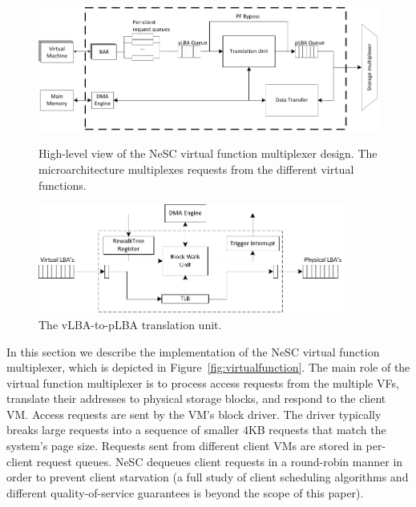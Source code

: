 \begin{figure}[t]
  \centering
  \includegraphics[width=\textwidth]{figs/virtual_function.pdf}
  \caption{High-level view of the NeSC virtual function multiplexer design. The microarchitecture multiplexes requests from the different virtual functions.}
   \label{fig:virtualfunction}

   \vspace*{3ex}
   
  \centering
  \includegraphics[width=0.9\textwidth]{figs/translation_unit.pdf}
  \caption{The vLBA-to-pLBA translation unit.}
   \label{fig:translation_unit}
\end{figure}

In this section we describe the implementation of the NeSC virtual function multiplexer, which is depicted in Figure~\ref{fig:virtualfunction}. The main role of the  virtual function multiplexer is to process access requests from the multiple VFs, translate their addresses to physical storage blocks, and respond to the client VM.
%
Access requests are sent by the VM's block driver. The driver typically breaks large requests into a sequence of smaller 4KB requests that match the system's page size. Requests sent from different client VMs are stored in per-client request queues. NeSC dequeues client requests in a round-robin manner in order to prevent client starvation (a full study of client scheduling algorithms and different quality-of-service guarantees is beyond the scope of this paper).

